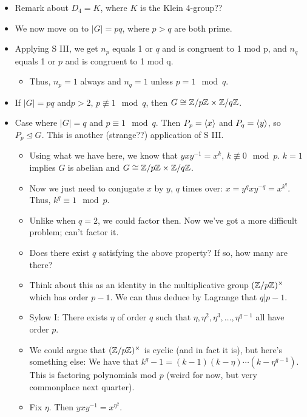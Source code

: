 \documentclass[../notes.tex]{subfiles}
\begin{document}
\begin{itemize}
    \begin{proof}
        The multiplication table is uniquely determined (analogous to the above argument).
    \end{proof}
    \item Remark about $D_4=K$, where $K$ is the Klein 4-group??
    \item We now move on to $|G|=pq$, where $p>q$ are both prime.
    \item Applying S III, we get $n_p$ equals 1 or $q$ and is congruent to 1 mod p, and $n_q$ equals 1 or $p$ and is congruent to 1 mod q.
    \begin{itemize}
        \item Thus, $n_p=1$ always and $n_q=1$ unless $p=1\mod q$.
    \end{itemize}
    \item If $|G|=pq$ and$p>2$, $p\not\equiv 1\mod q$, then $G\cong\mathbb{Z}/p\mathbb{Z}\times\mathbb{Z}/q\mathbb{Z}$.
    \item Case where $|G|=q$ and $p\equiv 1\mod q$. Then $P_p=\left\langle{x}\right\rangle$ and $P_q=\left\langle{y}\right\rangle$, so $P_p\trianglelefteq G$. This is another (strange??) application of S III.
    \begin{itemize}
        \item Using what we have here, we know that $yxy^{-1}=x^k$, $k\not\equiv 0\mod p$. $k=1$ implies $G$ is abelian and $G\cong\mathbb{Z}/p\mathbb{Z}\times\mathbb{Z}/q\mathbb{Z}$.
        \item Now we just need to conjugate $x$ by $y$, $q$ times over: $x=y^qxy^{-q}=x^{k^q}$. Thus, $k^q\equiv 1\mod p$.
        \item Unlike when $q=2$, we could factor then. Now we've got a more difficult problem; can't factor it.
        \item Does there exist $q$ satisfying the above property? If so, how many are there?
        \item Think about this as an identity in the multiplicative group $(\mathbb{Z}/p\mathbb{Z})^\times$ which has order $p-1$. We can thus deduce by Lagrange that $q|p-1$.
        \item Sylow I: There exists $\eta$ of order $q$ such that $\eta,\eta^2,\eta^3,\dots,\eta^{q-1}$ all have order $p$.
        \item We could argue that $(\mathbb{Z}/p\mathbb{Z})^\times$ is cyclic (and in fact it is), but here's something else: We have that $k^q-1=(k-1)(k-\eta)\cdots(k-\eta^{q-1})$. This is factoring polynomials mod $p$ (weird for now, but very commonplace next quarter).
        \item Fix $\eta$. Then $yxy^{-1}=x^{\eta^2}$.

\end{itemize}
\end{itemize}
\end{document}

